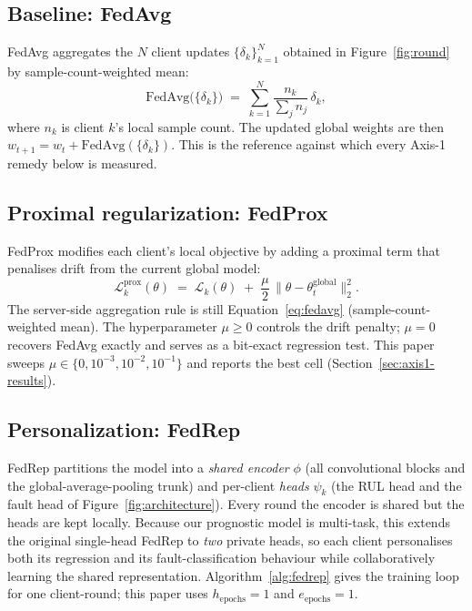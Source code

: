 \documentclass[a4paper,fleqn,doubleblind]{cas-sc}
\begin{document}
\subsection{Baseline: FedAvg}
\label{subsec:fedavg}

FedAvg \citep{McMahan2017FedAvg} aggregates the $N$ client updates
$\{\delta_k\}_{k=1}^N$ obtained in Figure~\ref{fig:round} by
sample-count-weighted mean:
\begin{equation}
    \mathrm{FedAvg}\bigl(\{\delta_k\}\bigr)
    \;=\; \sum_{k=1}^{N} \frac{n_k}{\sum_{j} n_j}\, \delta_k,
    \label{eq:fedavg}
\end{equation}
where $n_k$ is client $k$'s local sample count. The updated global
weights are then $w_{t+1} = w_t + \mathrm{FedAvg}(\{\delta_k\})$.
This is the reference against which every Axis-1 remedy below is
measured.

\subsection{Proximal regularization: FedProx}
\label{subsec:fedprox}

FedProx \citep{Li2020FedProx} modifies each client's local
objective by adding a proximal term that penalises drift from the
current global model:
\begin{equation}
    \mathcal{L}_k^{\mathrm{prox}}(\theta)
    \;=\; \mathcal{L}_k(\theta)
    \;+\; \frac{\mu}{2}\, \bigl\| \theta - \theta_t^{\mathrm{global}} \bigr\|_2^2.
    \label{eq:fedprox}
\end{equation}
The server-side aggregation rule is still Equation~\eqref{eq:fedavg}
(sample-count-weighted mean). The hyperparameter $\mu \geq 0$
controls the drift penalty; $\mu = 0$ recovers FedAvg exactly and
serves as a bit-exact regression test. This paper sweeps
$\mu \in \{0, 10^{-3}, 10^{-2}, 10^{-1}\}$ and reports the best
cell (Section~\ref{sec:axis1-results}).

\subsection{Personalization: FedRep}
\label{subsec:fedrep}

FedRep \citep{Collins2021FedRep} partitions the model into a
\emph{shared encoder} $\phi$ (all convolutional blocks and the
global-average-pooling trunk) and per-client \emph{heads} $\psi_k$
(the RUL head and the fault head of
Figure~\ref{fig:architecture}). Every round the encoder is shared
but the heads are kept locally. Because our prognostic model is
multi-task, this extends the original single-head FedRep to
\emph{two} private heads, so each client personalises both its
regression and its fault-classification behaviour while
collaboratively learning the shared representation.
Algorithm~\ref{alg:fedrep} gives
the training loop for one client-round; this paper uses
$h_{\mathrm{epochs}} = 1$ and $e_{\mathrm{epochs}} = 1$.
\end{document}
